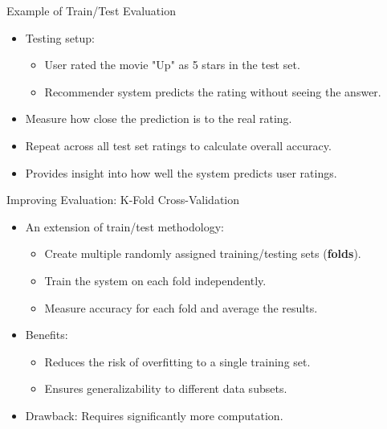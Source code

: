 \documentclass{beamer}
\begin{document}
\begin{frame}{Example of Train/Test Evaluation}
\begin{itemize}
    \item Testing setup:
    \begin{itemize}
        \item User rated the movie "Up" as 5 stars in the test set.
        \item Recommender system predicts the rating without seeing the answer.
    \end{itemize}
    \item Measure how close the prediction is to the real rating.
    \item Repeat across all test set ratings to calculate overall accuracy.
    \item Provides insight into how well the system predicts user ratings.
\end{itemize}
\end{frame}

\begin{frame}{Improving Evaluation: K-Fold Cross-Validation}
\begin{itemize}
    \item An extension of train/test methodology:
    \begin{itemize}
        \item Create multiple randomly assigned training/testing sets (\textbf{folds}).
        \item Train the system on each fold independently.
        \item Measure accuracy for each fold and average the results.
    \end{itemize}
    \item Benefits:
    \begin{itemize}
        \item Reduces the risk of overfitting to a single training set.
        \item Ensures generalizability to different data subsets.
    \end{itemize}
    \item Drawback: Requires significantly more computation.
\end{itemize}
\end{frame}
\end{document}
